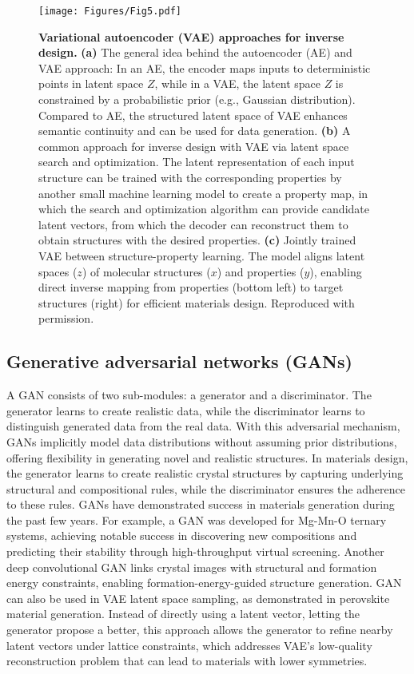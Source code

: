\documentclass[fleqn,10pt]{wlscirep}
\begin{document}
\begin{figure}[!htbp]
    \centering
    \texttt{[image: Figures/Fig5.pdf]}
    \caption{\textbf{Variational autoencoder (VAE) approaches for inverse design.} \textbf{(a)} The general idea behind the autoencoder (AE) and VAE approach: In an AE, the encoder maps inputs to deterministic points in latent space $Z$, while in a VAE, the latent space $Z$ is constrained by a probabilistic prior (e.g., Gaussian distribution). Compared to AE, the structured latent space of VAE enhances semantic continuity and can be used for data generation. \textbf{(b)} A common approach for inverse design with VAE via latent space search and optimization. The latent representation of each input structure can be trained with the corresponding properties by another small machine learning model to create a property map, in which the search and optimization algorithm can provide candidate latent vectors, from which the decoder can reconstruct them to obtain structures with the desired properties\cite{gomez2018automatic}. \textbf{(c)} Jointly trained VAE between structure-property learning\cite{fallani2024inverse}. The model aligns latent spaces ($z$) of molecular structures ($x$) and properties ($y$), enabling direct inverse mapping from properties (bottom left) to target structures (right) for efficient materials design. Reproduced with permission\cite{gomez2018automatic,fallani2024inverse}.}
    \label{fig5}
\end{figure}

\subsection{Generative adversarial networks (GANs)}
A GAN consists of two sub-modules: a generator and a discriminator. The generator learns to create realistic data, while the discriminator learns to distinguish generated data from the real data. With this adversarial mechanism, GANs implicitly model data distributions without assuming prior distributions, offering flexibility in generating novel and realistic structures\cite{goodfellow2014generative}. In materials design, the generator learns to create realistic crystal structures by capturing underlying structural and compositional rules, while the discriminator ensures the adherence to these rules. GANs have demonstrated success in materials generation during the past few years. For example, a GAN was developed for Mg-Mn-O ternary systems, achieving notable success in discovering new compositions and predicting their stability through high-throughput virtual screening\cite{kim2020generative}. Another deep convolutional GAN links crystal images with structural and formation energy constraints, enabling formation-energy-guided structure generation\cite{long2021constrained}.  GAN can also be used in VAE latent space sampling, as demonstrated in perovskite material generation. Instead of directly using a latent vector, letting the generator propose a better, this approach allows the generator to refine nearby latent vectors under lattice constraints, which addresses VAE's low-quality reconstruction problem that can lead to materials with lower symmetries\cite{Chenebuah2024}.
\end{document}
